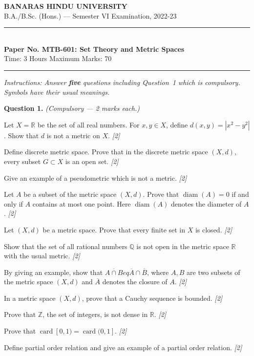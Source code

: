 \documentclass[11pt,a4paper]{article}
\newcommand{\pts}[1]{\hfill   \textit{[#1]}}
\begin{document}
\begin{center}
  {\large\bfseries BANARAS HINDU UNIVERSITY}\\[2pt]
  {\normalsize B.A./B.Sc. (Hons.) --- Semester VI Examination, 2022-23}\\[6pt]
  \rule{0.8\linewidth}{0.5pt}\\[6pt]
  {\large\bfseries Paper No. MTB-601: Set Theory and Metric Spaces}\\[4pt]
  {\normalsize Time: 3 Hours \hfill Maximum Marks: 70}
\end{center}
\rule{\linewidth}{0.4pt}
\smallskip



\noindent   \textit{Instructions: Answer   \textbf{five} questions including Question~1 which is compulsory. Symbols have their usual meanings.}
\bigskip




\noindent   \textbf{Question 1.}   \textit{(Compulsory --- 2 marks each.)}

\begin{parts}
  \item Let $X = \mathbb{R}$ be the set of all real numbers. For $x, y \in X$, define $d(x, y) = |x^2 - y^2|$. Show that $d$ is not a metric on $X$. \pts{2}
  \item Define discrete metric space. Prove that in the discrete metric space $(X, d)$, every subset $G \subset X$ is an open set. \pts{2}
  \item Give an example of a pseudometric which is not a metric. \pts{2}
  \item Let $A$ be a subset of the metric space $(X, d)$. Prove that $\operatorname{diam}(A) = 0$ if and only if $A$ contains at most one point. Here $\operatorname{diam}(A)$ denotes the diameter of $A$. \pts{2}
  \item Let $(X, d)$ be a metric space. Prove that every finite set in $X$ is closed. \pts{2}
  \item Show that the set of all rational numbers $\mathbb{Q}$ is not open in the metric space $\mathbb{R}$ with the usual metric. \pts{2}
  \item By giving an example, show that $\overline{A \cap B} 
eq \overline{A} \cap \overline{B}$, where $A, B$ are two subsets of the metric space $(X, d)$ and $\overline{A}$ denotes the closure of $A$. \pts{2}
  \item In a metric space $(X, d)$, prove that a Cauchy sequence is bounded. \pts{2}
  \item Prove that $\mathbb{Z}$, the set of integers, is not dense in $\mathbb{R}$. \pts{2}
  \item Prove that $\operatorname{card}[0, 1) = \operatorname{card}(0, 1]$. \pts{2}
  \item Define partial order relation and give an example of a partial order relation. \pts{2}
\end{parts}
\end{document}
